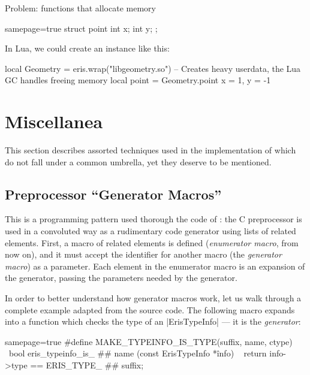 Problem: functions that allocate memory

\begin{ccode*}{samepage=true}
struct point {
	int x;
	int y;
};
\end{ccode*}

In Lua, we could create an instance like this:

\begin{luacode}
local Geometry = eris.wrap("libgeometry.so")
-- Creates heavy userdata, the Lua GC handles freeing memory
local point = Geometry.point { x = 1, y = -1 }
\end{luacode}



\section{Miscellanea}

This section describes assorted techniques used in the implementation of
\Eris* which do not fall under a common umbrella, yet they deserve to be
mentioned.

\subsection{Preprocessor “Generator Macros”}
  \label{sec:cpp-abuse-genmacros}

This is a programming pattern used thorough the code of \Eris*: the
C preprocessor is used in a convoluted way as a rudimentary code generator
using lists of related elements. First, a macro of related elements is defined
(\emph{enumerator macro}, from now on), and it must accept the identifier for
another macro (the \emph{generator macro}) as a parameter. Each element in the
enumerator macro is an expansion of the generator, passing the parameters
needed by the generator.

In order to better understand how generator macros work, let us walk through
a complete example adapted from the \Eris* source code. The following macro
expands into a function which checks the type of an \Mc|ErisTypeInfo| — it is
the \emph{generator}:

\begin{ccode*}{samepage=true}
#define MAKE_TYPEINFO_IS_TYPE(suffix, name, ctype)            \
    bool eris_typeinfo_is_ ## name (const ErisTypeInfo *înfo) \
    { return info->type == ERIS_TYPE_ ## suffix; }
\end{ccode*}

